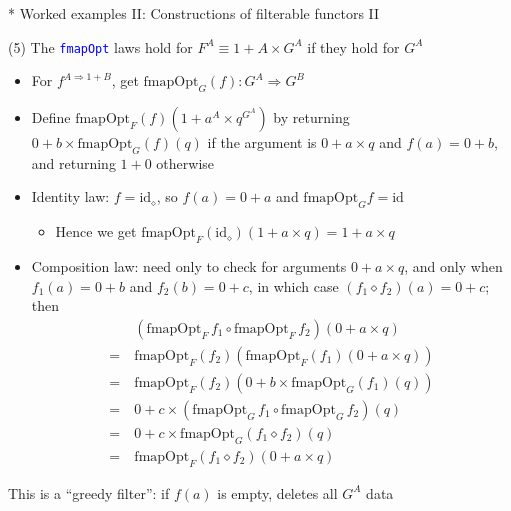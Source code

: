 \documentclass[english]{beamer}
\begin{document}
\begin{frame}{{*} Worked examples II: Constructions of filterable functors II}

(5) The \texttt{\textcolor{blue}{\footnotesize{}fmapOpt}} laws hold
for $F^{A}\equiv1+A\times G^{A}$ if they hold for $G^{A}$
\begin{itemize}
\item For $f^{A\Rightarrow1+B}$, get {\footnotesize{}$\text{fmapOpt}_{G}(f):G^{A}\Rightarrow G^{B}$}{\footnotesize \par}
\item {\footnotesize{}Define $\text{fmapOpt}_{F}(f)(1+a^{A}\times q^{G^{A}})$
by returning $0+b\times\text{fmapOpt}_{G}(f)(q)$ if the argument
is $0+a\times q$ and $f(a)=0+b$, and returning $1+0$ otherwise}{\footnotesize \par}
\item Identity law: {\footnotesize{}$f=\text{id}_{\diamond}$, so $f(a)=0+a$
and $\text{fmapOpt}_{G}f=\text{id}$}{\footnotesize \par}
\begin{itemize}
\item Hence we get{\footnotesize{} $\text{fmapOpt}_{F}(\text{id}_{\diamond})(1+a\times q)=1+a\times q$}{\footnotesize \par}
\end{itemize}
\item Composition law: {\footnotesize{}need only to check for arguments
$0+a\times q$, and only when $f_{1}(a)=0+b$ and $f_{2}(b)=0+c$,
in which case $(f_{1}\diamond f_{2})(a)=0+c$; then 
\begin{align*}
 & (\text{fmapOpt}_{F}\,f_{1}\circ\text{fmapOpt}_{F}\,f_{2})(0+a\times q)\\
=\  & \text{fmapOpt}_{F}(f_{2})\left(\text{fmapOpt}_{F}(f_{1})(0+a\times q)\right)\\
=\  & \text{fmapOpt}_{F}(f_{2})\left(0+b\times\text{fmapOpt}_{G}(f_{1})(q)\right)\\
=\  & 0+c\times(\text{fmapOpt}_{G}\,f_{1}\circ\text{fmapOpt}_{G}\,f_{2})(q)\\
=\  & 0+c\times\text{fmapOpt}_{G}(f_{1}\diamond f_{2})(q)\\
=\  & \text{fmapOpt}_{F}(f_{1}\diamond f_{2})(0+a\times q)
\end{align*}
}{\footnotesize \par}
\end{itemize}
This is a ``greedy filter'': if $f(a)$ is empty, deletes all $G^{A}$
data
\end{frame}
\end{document}
